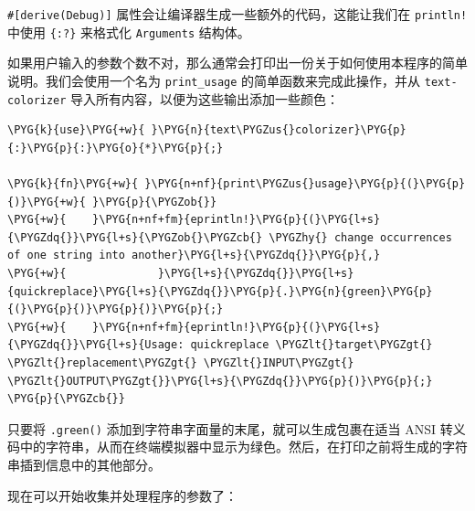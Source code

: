 \texttt{\#[derive(Debug)]} 属性会让编译器生成一些额外的代码，这能让我们在 \texttt{println!} 中使用 \texttt{\{:?\}} 来格式化 \texttt{Arguments} 结构体。

如果用户输入的参数个数不对，那么通常会打印出一份关于如何使用本程序的简单说明。我们会使用一个名为 \texttt{print\_usage} 的简单函数来完成此操作，并从 \texttt{text-colorizer} 导入所有内容，以便为这些输出添加一些颜色：

\begin{Verbatim}[commandchars=\\\{\},breaklines=true,breakanywhere=true,fontsize=\codefont,xleftmargin=17bp]
\PYG{k}{use}\PYG{+w}{ }\PYG{n}{text\PYGZus{}colorizer}\PYG{p}{:}\PYG{p}{:}\PYG{o}{*}\PYG{p}{;}

\PYG{k}{fn}\PYG{+w}{ }\PYG{n+nf}{print\PYGZus{}usage}\PYG{p}{(}\PYG{p}{)}\PYG{+w}{ }\PYG{p}{\PYGZob{}}
\PYG{+w}{    }\PYG{n+nf+fm}{eprintln!}\PYG{p}{(}\PYG{l+s}{\PYGZdq{}}\PYG{l+s}{\PYGZob{}\PYGZcb{} \PYGZhy{} change occurrences of one string into another}\PYG{l+s}{\PYGZdq{}}\PYG{p}{,}
\PYG{+w}{              }\PYG{l+s}{\PYGZdq{}}\PYG{l+s}{quickreplace}\PYG{l+s}{\PYGZdq{}}\PYG{p}{.}\PYG{n}{green}\PYG{p}{(}\PYG{p}{)}\PYG{p}{)}\PYG{p}{;}
\PYG{+w}{    }\PYG{n+nf+fm}{eprintln!}\PYG{p}{(}\PYG{l+s}{\PYGZdq{}}\PYG{l+s}{Usage: quickreplace \PYGZlt{}target\PYGZgt{} \PYGZlt{}replacement\PYGZgt{} \PYGZlt{}INPUT\PYGZgt{} \PYGZlt{}OUTPUT\PYGZgt{}}\PYG{l+s}{\PYGZdq{}}\PYG{p}{)}\PYG{p}{;}
\PYG{p}{\PYGZcb{}}
\end{Verbatim}

只要将 \texttt{.green()} 添加到字符串字面量的末尾，就可以生成包裹在适当 ANSI 转义码中的字符串，从而在终端模拟器中显示为绿色。然后，在打印之前将生成的字符串插到信息中的其他部分。

现在可以开始收集并处理程序的参数了：

